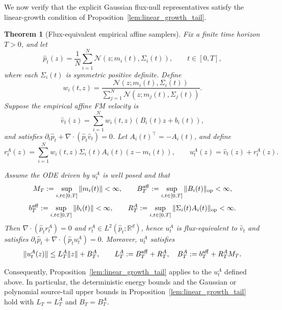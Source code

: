 \documentclass[a4paper,11pt]{article}
\theoremstyle{plain}
\newtheorem{theoreminner}{Theorem}[section]
\theoremstyle{definition}
\newenvironment{theorem}[1][]
  {\begin{mdframed}[style=theoremstyle]\begin{theoreminner}[#1]}
  {\end{theoreminner}\end{mdframed}}
\begin{document}
We now verify that the explicit Gaussian flux-null representatives satisfy the linear-growth condition of Proposition~\ref{lem:linear_growth_tail}.

\begin{theorem}[Flux-equivalent empirical affine samplers]
\label{thm:flux_equiv_affine_tail}
Fix a finite time horizon \(T>0\), and let
\[
    \hat p_t(z)
    =
    \frac1N\sum_{i=1}^N
    \mathcal N(z;m_i(t),\Sigma_i(t)),
    \qquad t\in[0,T],
\]
where each \(\Sigma_i(t)\) is symmetric positive definite. Define
\[
    w_i(t,z)
    =
    \frac{\mathcal N(z;m_i(t),\Sigma_i(t))}
    {\sum_{j=1}^N\mathcal N(z;m_j(t),\Sigma_j(t))}.
\]
Suppose the empirical affine FM velocity is
\[
    \hat v_t(z)
    =
    \sum_{i=1}^N
    w_i(t,z)(B_i(t)z+b_i(t)),
\]
and satisfies \(\partial_t\hat p_t+\nabla\cdot(\hat p_t\hat v_t)=0\).
Let \(A_i(t)^\top=-A_i(t)\), and define
\[
    r_t^A(z)
    =
    \sum_{i=1}^N
    w_i(t,z)\Sigma_i(t)A_i(t)(z-m_i(t)),
    \qquad
    u_t^A(z)=\hat v_t(z)+r_t^A(z).
\]


Assume the ODE driven by \(u_t^A\) is well posed and that
\[
    M_T:=\sup_{i,t\in[0,T]}\|m_i(t)\|<\infty,
    \qquad
    B_T^{\rm aff}:=\sup_{i,t\in[0,T]}\|B_i(t)\|_{\mathrm{op}}<\infty,
\]
\[
    b_T^{\rm aff}:=\sup_{i,t\in[0,T]}\|b_i(t)\|<\infty,
    \qquad
    R_T^A:=\sup_{i,t\in[0,T]}\|\Sigma_i(t)A_i(t)\|_{\mathrm{op}}<\infty.
\]
Then \(\nabla\cdot(\hat p_t r_t^A)=0\) and
\(r_t^A\in L^2(\hat p_t;\mathbb R^d)\), hence \(u_t^A\) is flux-equivalent
to \(\hat v_t\) and satisfies
\(
    \partial_t\hat p_t+\nabla\cdot(\hat p_tu_t^A)=0.
\)
Moreover, \(u_t^A\) satisfies
\[
    \|u_t^A(z)\|
    \le
    L_T^A\|z\|+B_T^A,
    \qquad
    L_T^A:=B_T^{\rm aff}+R_T^A,
    \quad
    B_T^A:=b_T^{\rm aff}+R_T^A M_T.
\]


\end{theorem}

Consequently, Proposition~\ref{lem:linear_growth_tail} applies to the \(u_t^A\) defined above.
In particular, the deterministic energy bounds and the Gaussian or polynomial
source-tail upper bounds in Proposition~\ref{lem:linear_growth_tail} hold with
\(L_T=L_T^A\) and \(B_T=B_T^A\).
\end{document}
